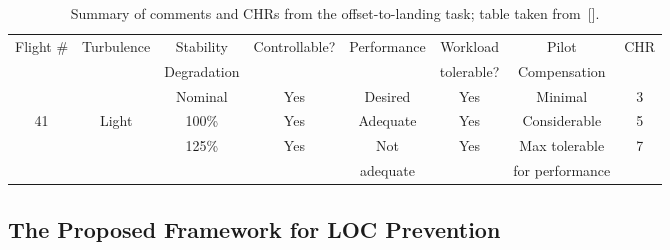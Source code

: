 \documentclass[letter,onecolumn,12pt]{aiaa-tc}
\newcommand{\Lone}{\mathcal{L}_1}
\begin{document}
\begin{table}[h]
\centering
\scriptsize
    \caption{\footnotesize Summary of comments and CHRs from the offset-to-landing task; table taken from~[].}\label{table:CHRs}
    \renewcommand{\arraystretch}{1.1}
    \begin{tabular}{| c | c | c | c | c | c | c | c|}
    \hline\hline
    Flight \#    & Turbulence    & Stability     & Controllable? & Performance   & Workload      & Pilot             & CHR\\
                &               & Degradation   &               &               & tolerable?    & Compensation      & \\
    \hline\hline
                &               & Nominal       & Yes           & Desired       & Yes           & Minimal           & 3\\
    \cline{3-8}
    41          & Light         & 100\%         & Yes           & Adequate      & Yes           & Considerable      & 5\\
    \cline{3-8}
                &               & 125\%         & Yes           & Not           & Yes           & Max tolerable     & 7\\
                &               &               &               & adequate      &               & for performance   &\\
    \hline\hline
  	\end{tabular}
\end{table}





\subsection{The Proposed Framework for LOC Prevention}
\label{subsec:framework}
\end{document}
